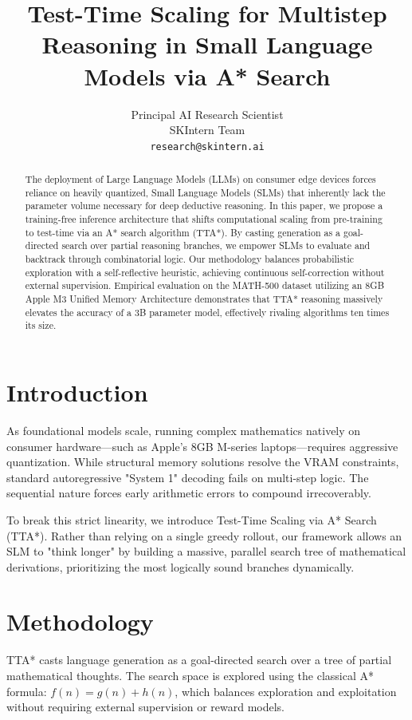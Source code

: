 \documentclass{article} %
\title{Test-Time Scaling for Multistep Reasoning in Small Language Models via A* Search}
\author{Principal AI Research Scientist \\
SKIntern Team \\
\texttt{research@skintern.ai}
}
\begin{document}
\maketitle

\begin{abstract}
The deployment of Large Language Models (LLMs) on consumer edge devices forces reliance on heavily quantized, Small Language Models (SLMs) that inherently lack the parameter volume necessary for deep deductive reasoning. In this paper, we propose a training-free inference architecture that shifts computational scaling from pre-training to test-time via an A* search algorithm (TTA*). By casting generation as a goal-directed search over partial reasoning branches, we empower SLMs to evaluate and backtrack through combinatorial logic. Our methodology balances probabilistic exploration with a self-reflective heuristic, achieving continuous self-correction without external supervision. Empirical evaluation on the MATH-500 dataset utilizing an 8GB Apple M3 Unified Memory Architecture demonstrates that TTA* reasoning massively elevates the accuracy of a 3B parameter model, effectively rivaling algorithms ten times its size.
\end{abstract}

\section{Introduction}
As foundational models scale, running complex mathematics natively on consumer hardware—such as Apple's 8GB M-series laptops—requires aggressive quantization. While structural memory solutions resolve the VRAM constraints, standard autoregressive "System 1" decoding fails on multi-step logic. The sequential nature forces early arithmetic errors to compound irrecoverably.

To break this strict linearity, we introduce Test-Time Scaling via A* Search (TTA*). Rather than relying on a single greedy rollout, our framework allows an SLM to "think longer" by building a massive, parallel search tree of mathematical derivations, prioritizing the most logically sound branches dynamically.

\section{Methodology}

TTA* casts language generation as a goal-directed search over a tree of partial mathematical thoughts. The search space is explored using the classical A* formula: $f(n) = g(n) + h(n)$, which balances exploration and exploitation without requiring external supervision or reward models.
\end{document}
